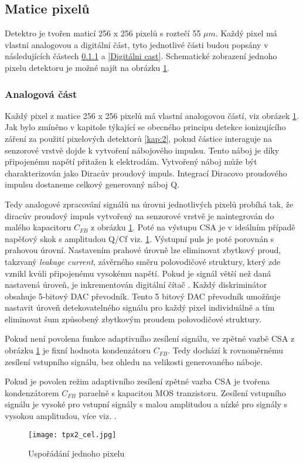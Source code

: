 \subsection{Matice pixelů}
Detektro je tvořen maticí 256 x 256 pixelů s roztečí  55 $\mu$$m$. Každý pixel má vlastní analogovou a digitální část, tyto jednotlivé části budou popsány v následujících částech \ref{analog} a \ref{Digitálni cast}. Schematické zobrazení jednoho pixelu detektoru je možné najít na obrázku \ref{fig:tpx2_cell}.
\subsubsection{Analogová část}	 %
\label{analog}
Každý pixel z matice 256 x 256 pixelů má vlastní analogovou částí, viz obrázek \ref{fig:tpx2_cell}. Jak bylo zmíněno v kapitole týkající se obecného principu detekce ionizujícího záření za použití pixelových detektorů \ref{kap:2}, pokud částice interaguje na senzorové vrstvě dojde k vytvoření nábojového impulsu. Tento náboj je díky připojenému napětí přitažen k elektrodám. Vytvořený náboj může být charakterizován jako Diracův proudový impuls. Integrací Diracovo proudového impulsu dostaneme celkový generovaný náboj Q. 
\par Tedy analogové zpracování signálů na úrovni jednotlivých pixelů probíhá tak, že diracův proudový impuls vytvořený na senzorové vrstvě je naintegrován do malého kapacitoru $C_{FB}$ z obrázku \ref{fig:tpx2_cell}. Poté na výstupu CSA je v ideálním případě napěťový skok s amplitudou Q/Cf viz. \ref{fig:tpx2_cell}. Výstupní puls je poté porovnán s prahovou úrovní. Nastavením prahové úrovně lze eliminovat zbytkový proud, takzvaný \textit{leakage current}, závěrného směru polovodičové struktury, který zde vznikl kvůli připojenému vysokému napětí. Pokud je signál větší než daná nastavená úroveň, je inkrementován digitální čítač \cite{Llopart}. Každý diskriminátor obsahuje 5-bitový DAC převodník. Tento 5 bitový DAC převodník umožňuje nastavit úroveň detekovatelného signálu pro každý pixel individuálně a tím eliminovat šum způsobený zbytkovým proudem polovodičové struktury.
\par Pokud není povolena funkce adaptivního zesílení signálu, ve zpětné vazbě CSA z obrázku \ref{fig:tpx2_cell} je fixní hodnota kondenzátoru $C_{FB}$. Tedy dochází k rovnoměrnému zesílení vstupního signálu, bez ohledu na velikosti generovaného náboje. 
\par Pokud je povolen režim adaptivního zesílení zpětné vazba CSA je tvořena kondenzátorem $C_{FB}$ paraelně s kapacitou MOS tranzistoru. Zesílení vstupního signálu je vysoké pro vstupní signály s malou amplitudou a nízké pro signály s vysokou amplitudou, více viz. \cite{MOS}.
\begin{figure}[h!]
	\centering
	\captionsetup{justification=centering}
	\texttt{[image: tpx2\_cel.jpg]}
	\caption{Uspořádání jednoho pixelu \cite{Timepix2}}
	\label{fig:tpx2_cell}
\end{figure}

